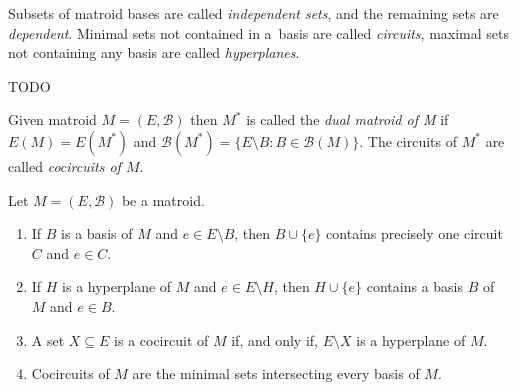 Subsets of matroid bases are called \textit{independent sets}, and the remaining sets are \textit{dependent}. Minimal sets not contained in a~basis are called \textit{circuits}, maximal sets not containing any basis are called \textit{hyperplanes}.

\begin{exmp*}
TODO
\end{exmp*}

\begin{defn}
Given matroid $M = (E,\mathcal{B})$ then $M^*$ is called the \textit{dual matroid of M} if $E(M) = E(M^*)$ and $\mathcal{B}(M^*) = \{E \setminus B : B \in \mathcal{B}(M) \}$. The circuits of $M^*$ are called \textit{cocircuits of $M$}.
\end{defn}


\begin{claim}
	\label{matroid_folklore}
	Let $M = (E, \mathcal{B})$ be a matroid.

	\begin{enumerate}[label=\alph*.]
		\item If $B$ is a basis of $M$ and $e \in E \setminus B$, then $B \cup \{e\}$ contains precisely one circuit $C$ and $e \in C$.
		\item If $H$ is a hyperplane of $M$ and $e \in E \setminus H$, then $H \cup \{e\}$ contains a basis $B$ of $M$ and $e \in B$.
		\item A set $X \subseteq E$ is a cocircuit of $M$ if, and only if, $E \setminus X$ is a hyperplane of $M$.
		\item Cocircuits of $M$ are the minimal sets intersecting every basis of $M$.
	\end{enumerate}
\end{claim}
